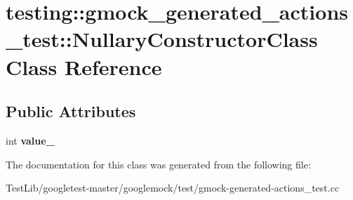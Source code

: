 \hypertarget{classtesting_1_1gmock__generated__actions__test_1_1NullaryConstructorClass}{}\section{testing\+:\+:gmock\+\_\+generated\+\_\+actions\+\_\+test\+:\+:Nullary\+Constructor\+Class Class Reference}
\label{classtesting_1_1gmock__generated__actions__test_1_1NullaryConstructorClass}
\subsection*{Public Attributes}
\begin{DoxyCompactItemize}
\item 
\mbox{\label{classtesting_1_1gmock__generated__actions__test_1_1NullaryConstructorClass_aa877ccc5aff335cbf81b8de90abee732}} 
int {\bfseries value\+\_\+}
\end{DoxyCompactItemize}


The documentation for this class was generated from the following file\+:\begin{DoxyCompactItemize}
\item 
Test\+Lib/googletest-\/master/googlemock/test/gmock-\/generated-\/actions\+\_\+test.\+cc\end{DoxyCompactItemize}
